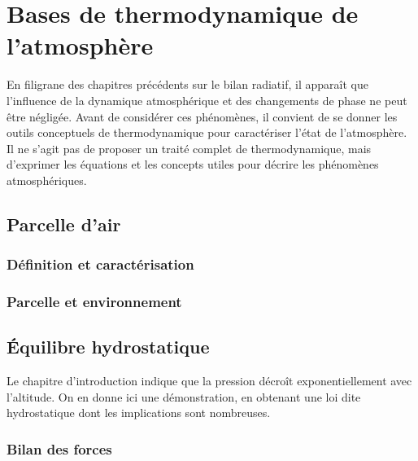 \chapter{Bases de thermodynamique de l'atmosphère}


\bk
En filigrane des chapitres précédents sur le bilan radiatif, il apparaît que l'influence de la dynamique atmosphérique et des changements de phase ne peut être négligée. Avant de considérer ces phénomènes, il convient de se donner les outils conceptuels de thermodynamique pour caractériser l'état de l'atmosphère. Il ne s'agit pas de proposer un traité complet de thermodynamique, mais d'exprimer les équations et les concepts utiles pour décrire les phénomènes atmosphériques. 


\mk \section{Parcelle d'air}

	\sk \subsection{Définition et caractérisation}
	
	


	\sk \subsection{Parcelle et environnement} \label{parcenv}
	

\mk \section{Équilibre hydrostatique}

\sk Le chapitre d'introduction indique que la pression décroît exponentiellement avec l'altitude. On en donne ici une démonstration, en obtenant une loi dite hydrostatique dont les implications sont nombreuses. 

	\sk \subsection{Bilan des forces}
	

